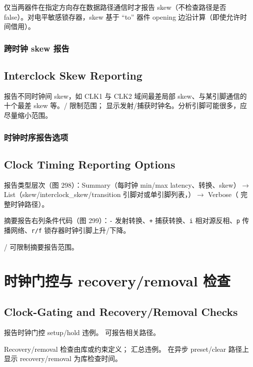 仅当两器件在指定方向存在数据路径通信时才报告 skew（不检查路径是否 false）。对电平敏感锁存器，skew 基于 “to” 器件 opening 边沿计算（即使允许时间借用）。

\subsubsection{跨时钟 skew 报告}
\subsection*{Interclock Skew Reporting}

 报告不同时钟间 skew，如 CLK1 与 CLK2 域间最差局部 skew、与某引脚通信的十个最差 skew 等。/ 限制范围； 显示发射/捕获时钟名。分析引脚可能很多，应尽量缩小范围。

\subsubsection{时钟时序报告选项}
\subsection*{Clock Timing Reporting Options}

报告类型层次（图 298）：Summary（每时钟 min/max latency、转换、skew）$\rightarrow$ List（skew/interclock\_skew/transition 引脚对或单引脚列表，）$\rightarrow$ Verbose（ 完整时钟路径）。

摘要报告右列条件代码（图 299）：\texttt{-} 发射转换、\texttt{+} 捕获转换、\texttt{i} 相对源反相、\texttt{p} 传播网络、\texttt{r/f} 锁存器时钟引脚上升/下降。

/ 可限制摘要报告范围。

\section{时钟门控与 recovery/removal 检查}
\subsection*{Clock-Gating and Recovery/Removal Checks}

 报告时钟门控 setup/hold 违例。 可报告相关路径。

Recovery/removal 检查由库或约束定义； 汇总违例。 在异步 preset/clear 路径上显示 recovery/removal 为库检查时间。

